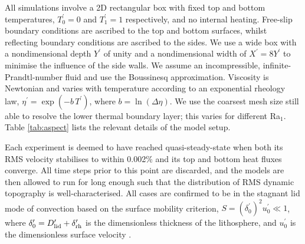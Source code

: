 All simulations involve a 2D rectangular box with fixed top and bottom temperatures, $T_0^\prime = 0$ and $T_1^\prime = 1$ respectively, and no internal heating. Free-slip boundary conditions are ascribed to the top and bottom surfaces, whilst reflecting boundary conditions are ascribed to the sides. We use a wide box with a nondimensional depth $Y^\prime$ of unity and a nondimensional width of $X^\prime = 8Y^\prime$ to minimise the influence of the side walls. We assume an incompressible, infinite-Prandtl-number fluid and use the Boussinesq approximation. Viscosity is Newtonian and varies with temperature according to an exponential rheology law, $\eta^\prime = \exp(-b \, T^\prime)$, where $b = \ln (\Delta \eta)$. We use the coarsest mesh size still able to resolve the lower thermal boundary layer; this varies for different Ra$_1$. Table \ref{tab:aspect} lists the relevant details of the model setup.

Each experiment is deemed to have reached quasi-steady-state when both its RMS velocity stabilises to within 0.002\% and its top and bottom heat fluxes converge. All time steps prior to this point are discarded, and the models are then allowed to run for long enough such that the distribution of RMS dynamic topography is well-characterised. All cases are confirmed to be in the stagnant lid mode of convection based on the surface mobility criterion, $S = (\delta_0^\prime)^2 u_0^\prime \ll 1$, where $\delta_0^\prime = D_{\rm lid}^\prime + \delta_{\rm rh}^\prime$ is the dimensionless thickness of the lithosphere, and $u_0^\prime$ is the dimensionless surface velocity \citep{solomatov_three_1997}.

